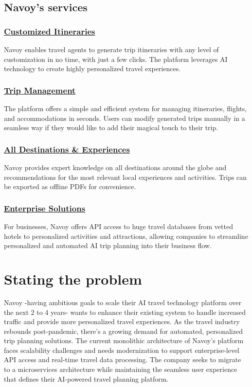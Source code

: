 \subsection{Navoy's services}
\subsubsection*{\underline{Customized Itineraries}}
Navoy enables travel agents to generate trip itineraries with any level of customization in no time, with just a few clicks. The platform leverages AI technology to create highly personalized travel experiences.

\subsubsection*{\underline{Trip Management}}
The platform offers a simple and efficient system for managing itineraries, flights, and accommodations in seconds. Users can modify generated trips manually in a seamless way if they would like to add their magical touch to their trip.

\subsubsection*{\underline{All Destinations \& Experiences}}
Navoy provides expert knowledge on all destinations around the globe and recommendations for the most relevant local experiences and activities. Trips can be exported as offline PDFs for convenience.

\subsubsection*{\underline{Enterprise Solutions}}
For businesses, Navoy offers API access to huge travel databases from vetted hotels to personalized activities and attractions, allowing companies to streamline personalized and automated AI trip planning into their business flow.

\section{Stating the problem}
Navoy -having ambitious goals to scale their AI travel technology platform over the next 2 to 4 years- wants to enhance their existing system to handle increased traffic and provide more personalized travel experiences. As the travel industry rebounds post-pandemic, there's a growing demand for automated, personalized trip planning solutions. The current monolithic architecture of Navoy's platform faces scalability challenges and needs modernization to support enterprise-level API access and real-time travel data processing. The company seeks to migrate to a microservices architecture while maintaining the seamless user experience that defines their AI-powered travel planning platform.

